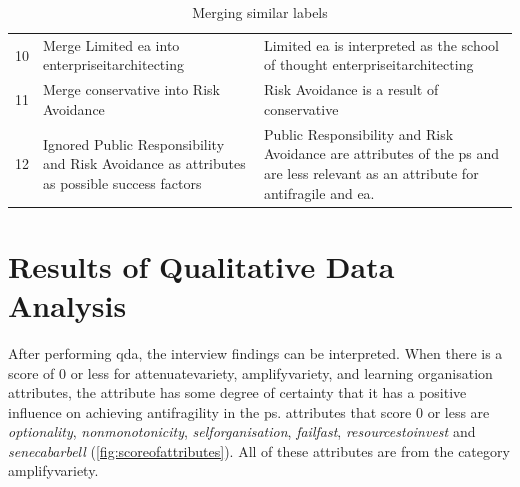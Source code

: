 \begin{table}[H]
{\begin{tabular}{p{}p{}p{}}
			10    & Merge Limited \acrshort{ea} into \gls{enterpriseitarchitecting} & Limited \acrshort{ea} is interpreted as the school of thought \gls{enterpriseitarchitecting} \\%
			11    & Merge conservative into Risk Avoidance & Risk Avoidance is a result of conservative \\%
			12	  & Ignored Public Responsibility and Risk Avoidance as \glspl{attribute} as possible success factors & Public Responsibility and Risk Avoidance are attributes of the \gls{ps} and are less relevant as an attribute for \gls{antifragile} and \acrshort{ea}. \\%
			\bottomrule %
		\end{tabular}%
	}%
	\caption{Merging similar labels}
	\label{tab:prepmergingsimilarlabels}%
\end{table}%
\section{Results of Qualitative Data Analysis}
\label{sec:resultsofqda}
After performing \acrfull{qda}, the interview findings can be interpreted. When there is a score of 0 or less for \gls{attenuatevariety}, \gls{amplifyvariety}, and learning organisation \glspl{attribute}, the \gls{attribute} has some degree of certainty that it has a positive influence on achieving \gls{antifragility} in the \gls{ps}. \Glspl{attribute} that score 0 or less are \textit{\gls{optionality}}, \textit{\gls{nonmonotonicity}}, \textit{\gls{selforganisation}}, \textit{\gls{failfast}}, \textit{\gls{resourcestoinvest}} and \textit{\gls{senecabarbell}} (\cref{fig:scoreofattributes}). All of these \glspl{attribute} are from the category \gls{amplifyvariety}.


